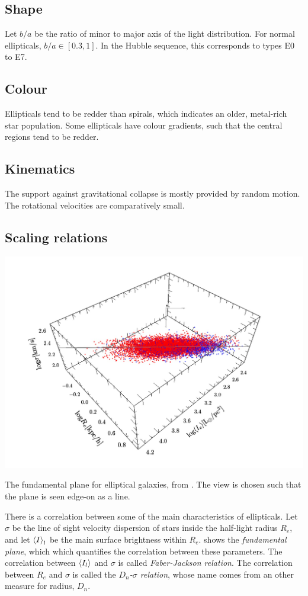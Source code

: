 \subsection{Shape}
Let $b/a$ be the ratio of minor to major axis of the light distribution.
For normal ellipticals, $b/a \in [0.3, 1]$.
In the Hubble sequence, this corresponds to types E0 to E7.

\subsection{Colour}
Ellipticals tend to be redder than spirals, which indicates an older, metal-rich star population.
Some ellipticals have colour gradients, such that the central regions tend to be redder.

\subsection{Kinematics}
The support against gravitational collapse is mostly provided by random motion.
The rotational velocities are comparatively small.


\subsection{Scaling relations}
\begin{marginfigure}
	\includegraphics[width=\textwidth]{img/ch-05/fundamental-plane.png}
	\caption{The fundamental plane for elliptical galaxies, from \cite{Magoulas:2012jy}. The view is chosen such that the plane is seen edge-on as a line.}
	\label{fig:fundamental-plane}
\end{marginfigure}
There is a correlation between some of the main characteristics of ellipticals.
Let $\sigma$ be the line of sight velocity dispersion of stars inside the half-light radius $R_e$,
and let $\left\langle I \right\rangle_l$ be the main surface brightness within $R_e$.
 shows the \emph{fundamental plane}, which which quantifies the correlation between these parameters.
The correlation between $\left\langle I_l \right\rangle$ and $\sigma$ is called \emph{Faber-Jackson relation}.
The correlation between $R_e$ and $\sigma$ is called the \emph{$D_n$-$\sigma$ relation}, whose name comes from an other measure for radius, $D_n$.



